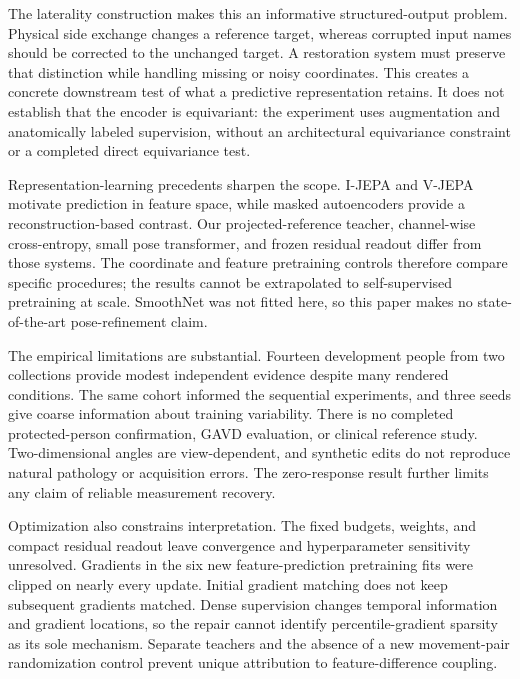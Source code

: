 \documentclass{article}
\begin{document}
The laterality construction makes this an informative structured-output problem. Physical side exchange changes a reference target, whereas corrupted input names should be corrected to the unchanged target. A restoration system must preserve that distinction while handling missing or noisy coordinates. This creates a concrete downstream test of what a predictive representation retains. It does not establish that the encoder is equivariant: the experiment uses augmentation and anatomically labeled supervision, without an architectural equivariance constraint or a completed direct equivariance test.

Representation-learning precedents sharpen the scope. I-JEPA and V-JEPA \citep{assran2023ijepa,bardes2024vjepa} motivate prediction in feature space, while masked autoencoders \citep{he2022mae} provide a reconstruction-based contrast. Our projected-reference teacher, channel-wise cross-entropy, small pose transformer, and frozen residual readout differ from those systems. The coordinate and feature pretraining controls therefore compare specific procedures; the results cannot be extrapolated to self-supervised pretraining at scale. SmoothNet was not fitted here, so this paper makes no state-of-the-art pose-refinement claim.

The empirical limitations are substantial. Fourteen development people from two collections provide modest independent evidence despite many rendered conditions. The same cohort informed the sequential experiments, and three seeds give coarse information about training variability. There is no completed protected-person confirmation, GAVD evaluation, or clinical reference study. Two-dimensional angles are view-dependent, and synthetic edits do not reproduce natural pathology or acquisition errors. The zero-response result further limits any claim of reliable measurement recovery.

Optimization also constrains interpretation. The fixed budgets, weights, and compact residual readout leave convergence and hyperparameter sensitivity unresolved. Gradients in the six new feature-prediction pretraining fits were clipped on nearly every update. Initial gradient matching does not keep subsequent gradients matched. Dense supervision changes temporal information and gradient locations, so the repair cannot identify percentile-gradient sparsity as its sole mechanism. Separate teachers and the absence of a new movement-pair randomization control prevent unique attribution to feature-difference coupling.
\end{document}
